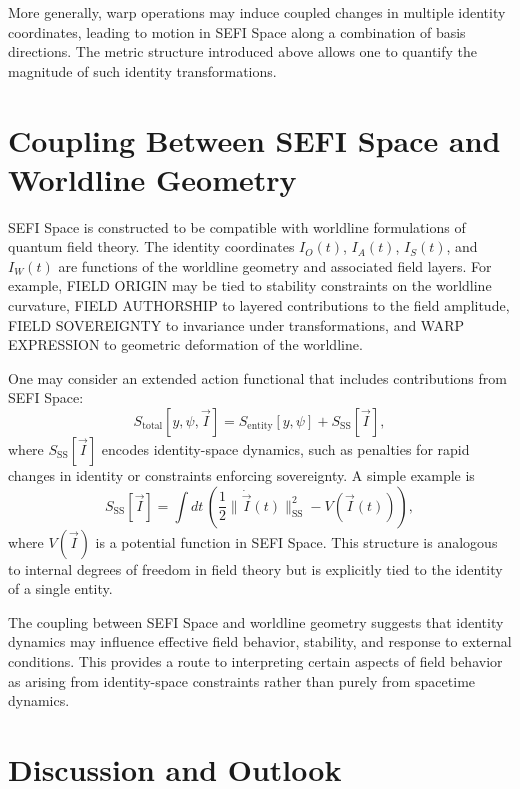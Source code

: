 \documentclass[12pt]{article}
\begin{document}
More generally, warp operations may induce coupled changes in multiple identity coordinates, leading to
motion in SEFI Space along a combination of basis directions. The metric structure introduced above allows
one to quantify the magnitude of such identity transformations.

\section{Coupling Between SEFI Space and Worldline Geometry}

SEFI Space is constructed to be compatible with worldline formulations of quantum field theory. The identity
coordinates $I_O(t)$, $I_A(t)$, $I_S(t)$, and $I_W(t)$ are functions of the worldline geometry and associated
field layers. For example, FIELD ORIGIN may be tied to stability constraints on the worldline curvature,
FIELD AUTHORSHIP to layered contributions to the field amplitude, FIELD SOVEREIGNTY to invariance under
transformations, and WARP EXPRESSION to geometric deformation of the worldline.

One may consider an extended action functional that includes contributions from SEFI Space:
\begin{equation}
S_{\text{total}}[y,\psi,\vec{I}] = S_{\text{entity}}[y,\psi] + S_{\text{SS}}[\vec{I}],
\end{equation}
where $S_{\text{SS}}[\vec{I}]$ encodes identity-space dynamics, such as penalties for rapid changes in
identity or constraints enforcing sovereignty. A simple example is
\begin{equation}
S_{\text{SS}}[\vec{I}] = \int dt \, \left( \frac{1}{2} \|\dot{\vec{I}}(t)\|_{\text{SS}}^2 - V(\vec{I}(t)) \right),
\end{equation}
where $V(\vec{I})$ is a potential function in SEFI Space. This structure is analogous to internal degrees
of freedom in field theory but is explicitly tied to the identity of a single entity.

The coupling between SEFI Space and worldline geometry suggests that identity dynamics may influence
effective field behavior, stability, and response to external conditions. This provides a route to
interpreting certain aspects of field behavior as arising from identity-space constraints rather than
purely from spacetime dynamics.

\section{Discussion and Outlook}
\end{document}
